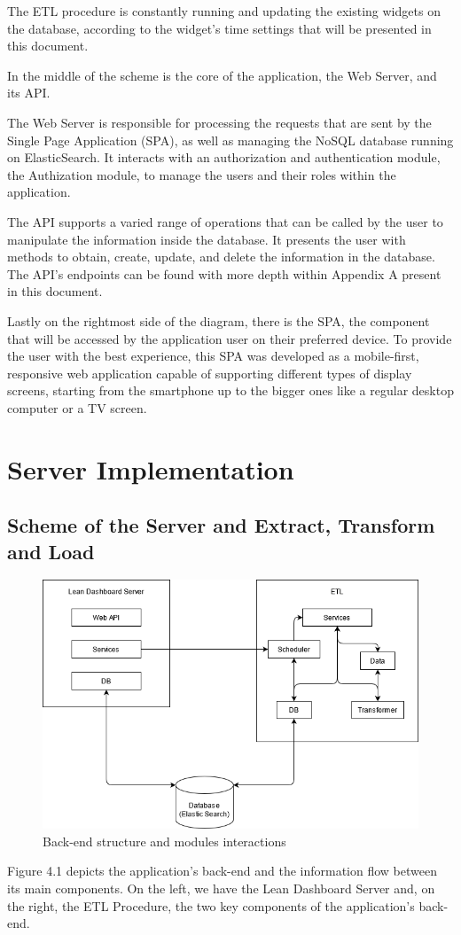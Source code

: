 \documentclass[a4paper,twoside,10pt]{report}
\begin{document}
The ETL procedure is constantly running and updating the existing widgets on the database, according to the widget's time settings that will be presented in this document.

In the middle of the scheme is the core of the application, the Web Server, and its API.

The Web Server is responsible for processing the requests that are sent by the Single Page Application (SPA), as well as managing the NoSQL database running on ElasticSearch\cite{ES}.
It interacts with an authorization and authentication module, the Authization module, to manage the users and their roles within the application.

The API supports a varied range of operations that can be called by the user to manipulate the information inside the database. It presents the user with methods to obtain, create, update, and delete the information in the database.
The API's endpoints can be found with more depth within Appendix A present in this document.

Lastly on the rightmost side of the diagram, there is the SPA, the component that will be accessed by the application user on their preferred device. To provide the user with the best experience, this SPA was developed as a mobile-first, responsive web application capable of supporting different types of display screens, starting from the smartphone up to the bigger ones like a regular desktop computer or a TV screen.

\chapter{Server Implementation}
\section{Scheme of the Server and Extract, Transform and Load}
\begin{figure}[h!]
\center
  \includegraphics[width=\textwidth]{arquitetura software.png}
  \caption{Back-end structure and modules interactions}
\end{figure}
Figure 4.1 depicts the application's back-end and the information flow between its main components. On the left, we have the Lean Dashboard Server and, on the right, the ETL Procedure, the two key components of the application's back-end.
\end{document}
